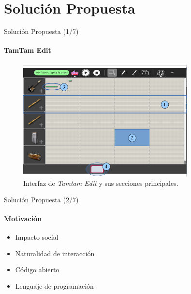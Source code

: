 \section{Soluci\'on Propuesta}

\begin{frame}{Soluci\'on Propuesta (1/7)}
\framesubtitle{TamTam Edit}

\begin{figure}[H]
\centering
\includegraphics[width=0.8\textwidth]{./graphics/ui-tamtam-edit.png}
\caption{Interfaz de \emph{Tamtam Edit} y sus secciones principales.}
\label{figure:ui-tamtam}
\end{figure}

\end{frame}

\begin{frame}{Soluci\'on Propuesta (2/7)}
\framesubtitle{Motivaci\'on}
\begin{itemize}
    \item<+-> Impacto social
    \item<+-> Naturalidad de interacci\'on
    \item<+-> C\'odigo abierto
    \item<+-> Lenguaje de programaci\'on
\end{itemize}
\end{frame}

